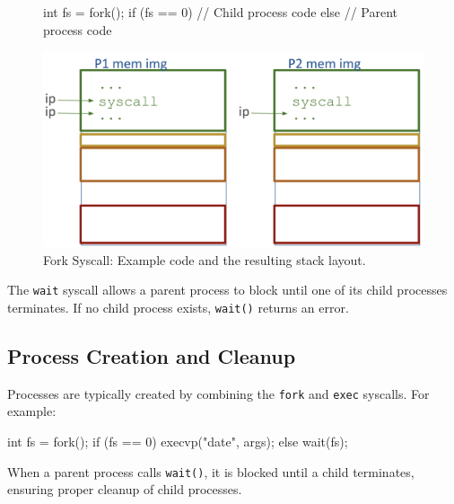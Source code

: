 \begin{figure}[htp]
  \centering
  \begin{minipage}[b]{0.45\textwidth}
    \begin{cc}
int fs = fork();
if (fs == 0) {
   // Child process code
} else {
   // Parent process code
}




    \end{cc}
  \end{minipage}
  \hfill
  \vline
  \hfill
  \begin{minipage}[b]{0.45\textwidth}
    \centering
    \includegraphics[width=1.25\textwidth]{chapters/L3/images/fork.png}
  \end{minipage}
  \caption{Fork Syscall: Example code and the resulting stack layout.}
\end{figure}

\begin{definition}
The \texttt{wait} syscall allows a parent process to block until one of its child processes terminates. If no child process exists, \texttt{wait()} returns an error.
\end{definition}

\subsection{Process Creation and Cleanup}

Processes are typically created by combining the \texttt{fork} and \texttt{exec} syscalls. For example:
\begin{cc}
int fs = fork();
if (fs == 0) {
   execvp("date", args);
} else {
   wait(fs);
}
\end{cc}

When a parent process calls \texttt{wait()}, it is blocked until a child terminates, ensuring proper cleanup of child processes.
\newpage

